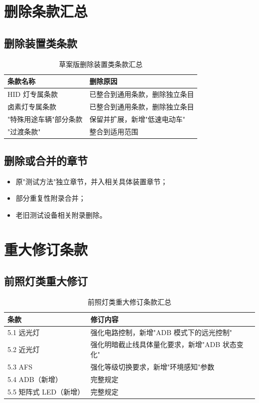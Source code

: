 \section{删除条款汇总}

\subsection{删除装置类条款}

\begin{table}[H]
\centering
\caption{草案版删除装置类条款汇总}
\begin{tabular}{|l|l|}
\hline
\textbf{条款名称} & \textbf{删除原因} \\
\hline
HID 灯专属条款    & 已整合到通用条款，删除独立条目 \\
\hline
卤素灯专属条款    & 已整合到通用条款，删除独立条目 \\
\hline
"特殊用途车辆"部分条款 & 保留并扩展，新增"低速电动车" \\
\hline
"过渡条款"       & 整合到适用范围 \\
\hline
\end{tabular}
\end{table}

\subsection{删除或合并的章节}

\begin{itemize}[leftmargin=2em]
    \item 原"测试方法"独立章节，并入相关具体装置章节；
    \item 部分重复性附录合并；
    \item 老旧测试设备相关附录删除。
\end{itemize}

\section{重大修订条款}

\subsection{前照灯类重大修订}

\begin{table}[H]
\centering
\caption{前照灯类重大修订条款汇总}
\small
\begin{tabularx}{\textwidth}{|l|X|}
\hline
\textbf{条款} & \textbf{修订内容} \\
\hline
5.1 远光灯       & 强化电路控制，新增"ADB 模式下的远光控制" \\
\hline
5.2 近光灯       & 强化明暗截止线具体量化要求，新增"ADB 状态变化" \\
\hline
5.3 AFS         & 强化等级切换要求，新增"环境感知"参数 \\
\hline
5.4 ADB（新增）   & 完整规定 \\
\hline
5.5 矩阵式 LED（新增）& 完整规定 \\
\hline
\end{tabularx}
\end{table}

